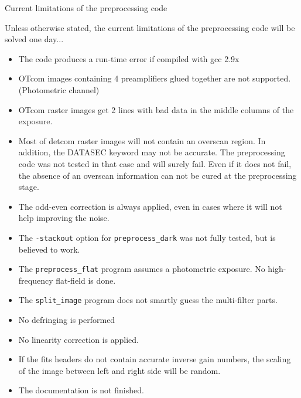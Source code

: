 \begin{subsection}{Current limitations of the preprocessing code}

Unless otherwise stated, the current limitations of the preprocessing
code will be solved one day...
\begin{itemize}
\item The code produces a run-time error if compiled with gcc 2.9x
\item OTcom images containing 4 preamplifiers glued together are not
supported. (Photometric channel)
\item OTcom raster images get 2 lines with bad data in the middle
columns of the exposure.
\item Most of detcom raster images will not contain an overscan
region. In addition, the DATASEC keyword may not be accurate. 
The preprocessing code was not tested in that case and will surely
fail. Even if it does not fail, the absence of an overscan information
can not be cured at the preprocessing stage.
\item The odd-even correction is always applied, even in cases where
it will not help improving the noise.
\item The {\tt -stackout} option for {\tt preprocess\_dark} was not
fully tested, but is believed to work.
\item The {\tt preprocess\_flat} program assumes a photometric
exposure. No high-frequency flat-field is done.
\item The {\tt split\_image} program does not smartly guess the
multi-filter parts.
\item No defringing is performed
\item No linearity correction is applied.
\item If the fits headers do not contain accurate inverse gain
numbers, the scaling of the image between left and right side will be
random.
\item The documentation is not finished.
\end{itemize}

\end{subsection}

